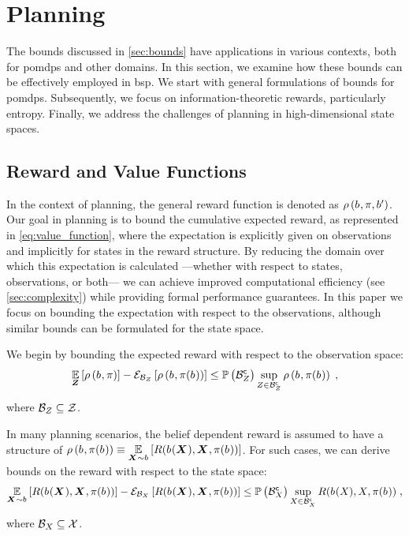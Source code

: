 \chapter{Planning}

The bounds discussed in \cref{sec:bounds} have applications in various contexts, both for \glspl{pomdp} and other domains. In this section, we examine how these bounds can be effectively employed in \gls{bsp}. We start with general formulations of bounds for \glspl{pomdp}. Subsequently, we focus on information-theoretic rewards, particularly entropy. Finally, we address the challenges of planning in high-dimensional state spaces.

\section{Reward and Value Functions}

In the context of planning, the general reward function is denoted as $\rho\left(b_{},\pi,b_{}^\prime\right)$. Our goal in planning is to bound the cumulative expected reward, as represented in \eqref{eq:value_function}, where the expectation is explicitly given on observations and implicitly for states in the reward structure. By reducing the domain over which this expectation is calculated ---whether with respect to states, observations, or both--- we can achieve improved computational efficiency (see \cref{sec:complexity}) while providing formal performance guarantees. In this paper we focus on bounding the expectation with respect to the observations, although similar bounds can be formulated for the state space.

We begin by bounding the expected reward with respect to the observation space:
\begin{equation}
		\operatorname*{\mathbb{E}}\limits_{\boldsymbol Z_{}}\left[{\rho\left(b_{},\pi\right)}\right]-\mathcal{E}_{\mathcal{B}_{Z_{}}}\left[{\rho\left(b_{},\pi(b_{})\right)}\right]
		\leq\mathbb{P}\left({{\mathcal B}^{\mathsf{c}}_{Z_{}}}\right)\sup_{Z_{}\in{\ensuremath{\mathcal B}}^{\mathsf{c}}_{Z_{}}}\rho\left(b_{},\pi(b_{})\right)\;,
\end{equation}
where $\mathcal{B}_{Z_{}}\subseteq\mathcal Z$.

In many planning scenarios, the belief dependent reward is assumed to have a structure of $\rho\left(b_{},\pi(b_{})\right)\equiv \operatorname*{\mathbb{E}}\limits_{\boldsymbol X_{}\sim b_{}}\left[{R(b_{}(\boldsymbol X_{}),\boldsymbol X_{},\pi(b_{}))}\right]$. For such cases, we can derive bounds on the reward with respect to the state space:
\begin{equation}
		\operatorname*{\mathbb{E}}\limits_{\boldsymbol X_{}\sim b_{}}\left[{R(b_{}(\boldsymbol X_{}),\boldsymbol X_{},\pi(b_{}))}\right]-\mathcal{E}_{\mathcal{B}_{X_{}}}\left[{R(b_{}(\boldsymbol X_{}),\boldsymbol X_{},\pi(b_{}))}\right]
		\leq\mathbb{P}\left({{\mathcal B}^{\mathsf{c}}_{X_{}}}\right)\sup_{X_{}\in{\ensuremath{\mathcal B}}^{\mathsf{c}}_{X_{}}}R(b_{}(X_{}),X_{},\pi(b_{}))\;,
\end{equation}
where $\mathcal{B}_{X_{}}\subseteq\mathcal X$.

